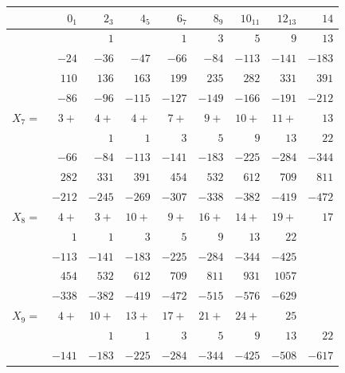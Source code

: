 \documentclass[11pt]{article}
\begin{document}
\begin{center}\small
\begin{tabular}{l|rrrrrrrr}
            & $0_{1}$ & $2_{3}$ & $4_{5}$ & $6_{7}$ & $8_{9}$ & $10_{11}$ & $12_{13}$ & $14$ \\\hline
            &         & $1$     &         & $1$     & $3$     & $5$       & $9$       & $13$ \\
            & $-24$   & $-36$   & $-47$   & $-66$   & $-84$   & $-113$    & $-141$    & $-183$\\
            & $110$   & $136$   & $163$   & $199$   & $235$   & $282$     & $331$     & $391$ \\
            & $-86$   & $-96$   & $-115$  & $-127$  & $-149$  & $-166$    & $-191$    & $-212$\\
$X_{7}=$    & $3+$    & $4+$    & $4+$    & $7+$    & $9+$    & $10+$     & $11+$     & $13$  \\\hline
            &         & $1$     & $1$     & $3$     & $5$     & $9$       & $13$      & $22$  \\
            & $-66$   & $-84$   & $-113$  & $-141$  & $-183$  & $-225$    & $-284$    & $-344$\\
            & $282$   & $331$   & $391$   & $454$   & $532$   & $612$     & $709$     & $811$ \\
            & $-212$  & $-245$  & $-269$  & $-307$  & $-338$  & $-382$    & $-419$    & $-472$\\
$X_{8}=$    & $4+$    & $3+$    & $10+$   & $9+$    & $16+$   & $14+$     & $19+$     & $17$  \\\hline
            & $1$     & $1$     & $3$     & $5$     & $9$     & $13$      & $22$      &       \\
            & $-113$  & $-141$  & $-183$  & $-225$  & $-284$  & $-344$    & $-425$    &       \\
            & $454$   & $532$   & $612$   & $709$   & $811$   & $931$     & $1057$    &       \\
            & $-338$  & $-382$  & $-419$  & $-472$  & $-515$  & $-576$    & $-629$    &       \\
$X_{9}=$    & $4+$    & $10+$   & $13+$   & $17+$   & $21+$   & $24+$     & $25$      &       \\\hline
            &         & $1$     & $1$     & $3$     & $5$     & $9$       & $13$      & $22$  \\
            & $-141$  & $-183$  & $-225$  & $-284$  & $-344$  & $-425$    & $-508$    & $-617$\\

\end{tabular}
\end{center}
\end{document}
